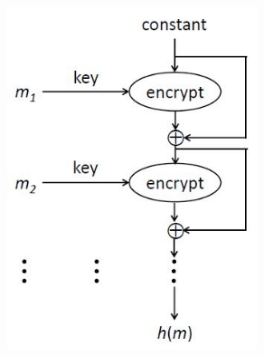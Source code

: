 \begin{figure}
	\begin{center}
	{\includegraphics[height=10cm, width=10cm, keepaspectratio]{Immagini/hash/schema_des_come_hash_2.JPG}}
	\end{center}
\end{figure}

